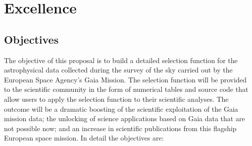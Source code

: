 \renewcommand{\thetable}{\thesection\alph{table}}

\chapter[Excellence]{Excellence}
\label{cha:excellence}

\section{Objectives}
\label{sec:objectives}

The objective of this proposal is to build a detailed selection function for the astrophysical data collected during the survey of the sky carried out by the European Space Agency's Gaia Mission. The selection function will be provided to the scientific community in the form of numerical tables and source code that allow users to apply the selection function to their scientific analyses. The outcome will be a dramatic boosting of the scientific exploitation of the Gaia mission data; the unlocking of science applications based on Gaia data that are not possible now; and an increase in scientific publications from this flagship European space mission. In detail the objectives are:

